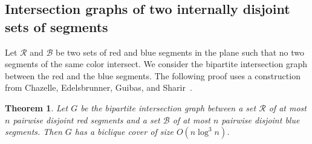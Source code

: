 \documentclass{amsart}
\newtheorem{theorem}{Theorem}%
\begin{document}
\subsection{Intersection graphs of two internally disjoint sets of segments}

Let $\mathcal{R}$ and $\mathcal{B}$ be two sets of red and blue segments in the plane such that no two segments of the same color intersect. We consider the bipartite intersection graph between the red and the blue segments. The following proof uses a construction from Chazelle, Edelsbrunner, Guibas, and Sharir~\cite{CEGS94}.

\begin{theorem}
    Let $G$ be the bipartite intersection graph between a set $\mathcal{R}$ of at most $n$ pairwise disjoint red segments and a set $\mathcal{B}$ of at most $n$ pairwise disjoint blue segments. Then $G$ has a biclique cover of size $O(n\log^3 n)$.
\end{theorem}
\end{document}
